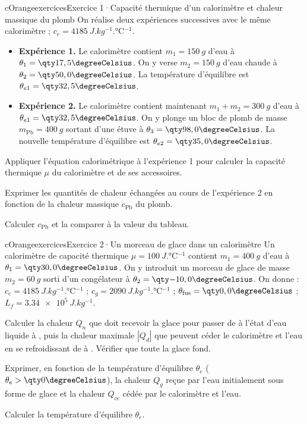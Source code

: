 \begin{rub}[unbreakable]{cOrange}{exercices}{Exercice 1\enspace·\enspace Capacité thermique d’un calorimètre et chaleur massique du plomb}
On réalise deux expériences successives avec le même calorimètre ; $c_e = \qty{4185}{J.kg^{-1}.\degreeCelsius^{-1}}$.
\begin{itemize}
  \item \textbf{Expérience 1.} Le calorimètre contient $m_1 = \qty{150}{g}$ d’eau à $\theta_1 = \dC{17,5}$. On y verse $m_2 = \qty{150}{g}$ d’eau chaude à $\theta_2 = \dC{50,0}$. La température d’équilibre est $\theta_{e1} = \dC{32,5}$.
  \item \textbf{Expérience 2.} Le calorimètre contient maintenant $m_1 + m_2 = \qty{300}{g}$ d’eau à $\theta_{e1} = \dC{32,5}$. On y plonge un bloc de plomb de masse $m_{\mathrm{Pb}} = \qty{400}{g}$ sortant d’une étuve à $\theta_3 = \dC{98,0}$. La nouvelle température d’équilibre est $\theta_{e2} = \dC{35,0}$.
\end{itemize}
\begin{exq}
  \item Appliquer l’équation calorimétrique à l’expérience 1 pour calculer la capacité thermique $\mu$ du calorimètre et de ses accessoires.
  \item Exprimer les quantités de chaleur échangées au cours de l’expérience 2 en fonction de la chaleur massique $c_{\mathrm{Pb}}$ du plomb.
  \item Calculer $c_{\mathrm{Pb}}$ et la comparer à la valeur du tableau.
\end{exq}
\end{rub}

\begin{rub}[unbreakable]{cOrange}{exercices}{Exercice 2\enspace·\enspace Un morceau de glace dans un calorimètre}
Un calorimètre de capacité thermique $\mu = \qty{100}{J.\degreeCelsius^{-1}}$ contient $m_1 = \qty{400}{g}$ d’eau à $\theta_1 = \dC{30,0}$. On y introduit un morceau de glace de masse $m_2 = \qty{60}{g}$ sorti d’un congélateur à $\theta_2 = \dC{-10,0}$. On donne : $c_e = \qty{4185}{J.kg^{-1}.\degreeCelsius^{-1}}$ ; $c_g = \qty{2090}{J.kg^{-1}.\degreeCelsius^{-1}}$ ; $\tfus = \dC{0,0}$ ; $L_f = \qty{3,34e5}{J.kg^{-1}}$.
\begin{exq}
  \item Calculer la chaleur $Q_n$ que doit recevoir la glace pour passer de  à l’état d’eau liquide à , puis la chaleur maximale $|Q_d|$ que peuvent céder le calorimètre et l’eau en se refroidissant de  à . Vérifier que toute la glace fond.
  \item Exprimer, en fonction de la température d’équilibre $\theta_e$ ($\theta_e > \dC{0}$), la chaleur $Q_g$ reçue par l’eau initialement sous forme de glace et la chaleur $Q_{ce}$ cédée par le calorimètre et l’eau.
  \item Calculer la température d’équilibre $\theta_e$.
\end{exq}
\end{rub}

